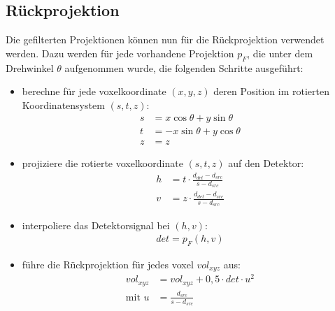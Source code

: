 \subsection{Rückprojektion}\label{sssec:backprojection}

Die gefilterten Projektionen können nun für die Rückprojektion verwendet werden. Dazu werden für jede vorhandene
Projektion $p_F$, die unter dem Drehwinkel $\theta$ aufgenommen wurde, die folgenden Schritte ausgeführt:

\begin{itemize}
    \item berechne für jede \gls{voxel}koordinate $(x, y, z)$ deren Position im rotierten Koordinatensystem
          $(s, t, z)$:
        \begin{equation}
            \begin{aligned}
                s &= x \cos \theta + y \sin \theta\\
                t &= -x \sin \theta + y \cos \theta\\
                z &= z
            \end{aligned}
        \end{equation}

    \item projiziere die rotierte \gls{voxel}koordinate $(s, t, z)$ auf den Detektor:
        \begin{equation}
            \begin{aligned}
                h &= t \cdot \frac{d_{det} - d_{src}}{s - d_{src}}\\
                v &= z \cdot \frac{d_{det} - d_{src}}{s - d_{src}}
            \end{aligned}
        \end{equation}

    \item interpoliere das Detektorsignal bei $(h, v)$:
        \begin{equation}
            \begin{aligned}
                det = p_F(h, v)
            \end{aligned}
        \end{equation}

    \item führe die Rückprojektion für jedes \gls{voxel} $vol_{xyz}$ aus:
        \begin{equation}
            \begin{aligned}
                vol_{xyz} &= vol_{xyz} + 0,5 \cdot det \cdot u^2\\
                \text{mit } u &= \frac{d_{src}}{s - d_{src}}
            \end{aligned}
        \end{equation}
\end{itemize}
